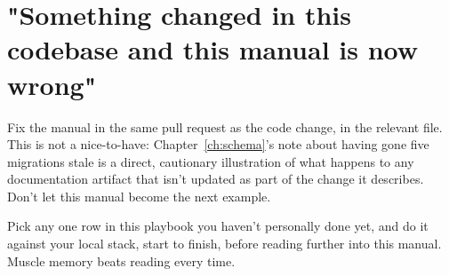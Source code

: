 \section{"Something changed in this codebase and this manual is now wrong"}
Fix the manual in the same pull request as the code change, in the relevant  file. This is not a nice-to-have: Chapter~\ref{ch:schema}'s note about  having gone five migrations stale is a direct, cautionary illustration of what happens to any documentation artifact that isn't updated as part of the change it describes. Don't let this manual become the next example.

\begin{olktask}
Pick any one row in this playbook you haven't personally done yet, and do it against your local stack, start to finish, before reading further into this manual. Muscle memory beats reading every time.
\end{olktask}
